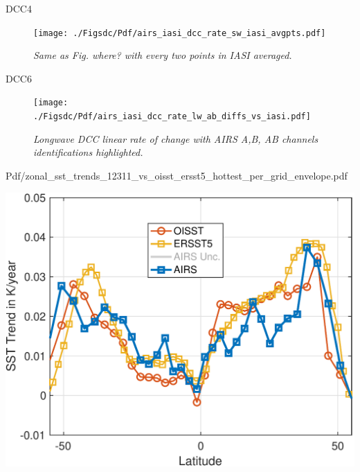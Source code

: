 \documentclass[presentation]{beamer}
\begin{document}
\begin{frame}[label={sec:orgd9280c4}]{DCC4}
\begin{figure}[htbp]
\centering
\texttt{[image: ./Figsdc/Pdf/airs\_iasi\_dcc\_rate\_sw\_iasi\_avgpts.pdf]}
\caption{\emph{Same as Fig. where? with every two points in IASI averaged.}}
\end{figure}
\end{frame}

\begin{frame}[label={sec:org2a1f757}]{DCC6}
\begin{figure}[htbp]
\centering
\texttt{[image: ./Figsdc/Pdf/airs\_iasi\_dcc\_rate\_lw\_ab\_diffs\_vs\_iasi.pdf]}
\caption{\emph{Longwave DCC linear rate of change with AIRS A,B, AB channels identifications highlighted.}}
\end{figure}
\end{frame}



\begin{frame}[label={sec:org4cfc113}]{Pdf/zonal\_sst\_trends\_12311\_vs\_oisst\_ersst5\_hottest\_per\_grid\_envelope.pdf}
\begin{center}
\includegraphics[width=0.7\linewidth]{./Figs/Pdf/zonal_sst_trends_12311_vs_oisst_ersst5_hottest_per_grid_envelope.pdf}
\end{center}
\end{frame}
\end{document}
